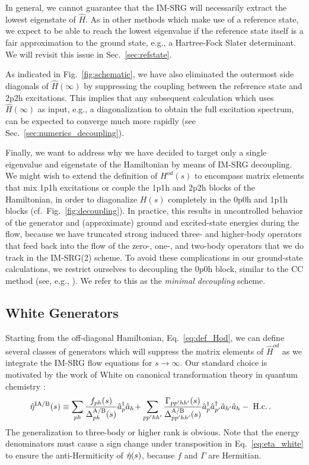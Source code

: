 In general, we cannot guarantee that the IM-SRG will necessarily extract the lowest eigenstate 
of $\hat{H}$. As in other methods which make use of a reference state, we expect to be able to reach 
the lowest eigenvalue if the reference state itself is a fair approximation to the ground state, e.g., 
a Hartree-Fock Slater determinant. We will revisit this issue in Sec.~\ref{sec:refstate}.

As indicated in Fig.~\ref{fig:schematic}, we have also eliminated the outermost side diagonals of 
$\hat{H}(\infty)$ by suppressing the coupling between the reference state and $2$p$2$h excitations. This 
implies that any subsequent calculation which uses $\hat{H}(\infty)$ as input, e.g., a diagonalization to 
obtain the full excitation spectrum, can be expected to converge much more rapidly (see 
Sec.~\ref{sec:numerics_decoupling}). 

Finally, we want to address why we have decided to target only a single eigenvalue and eigenstate
of the Hamiltonian by means of IM-SRG decoupling. We might wish to extend the definition 
of $H^{od}(s)$ to encompass matrix elements that mix 1p1h excitations or couple the 1p1h and 2p2h 
blocks of the Hamiltonian, in order to diagonalize $H(s)$ completely in the 0p0h and 1p1h blocks 
(cf.~Fig.~\ref{fig:decoupling}). In practice, this results in uncontrolled behavior of the generator 
and (approximate) ground and excited-state energies during the flow, because we have truncated strong induced 
three- and higher-body operators that feed back into the flow of the zero-, one-, and two-body operators that
we do track in the IM-SRG(2) scheme. To avoid these complications in our ground-state calculations, we 
restrict ourselves to decoupling the 0p0h block, similar to the CC method (see, e.g., 
\cite{shavittbartlett2009}). We refer to this as the \emph{minimal decoupling} scheme. 


\subsection{\label{sec:white}White Generators}
Starting from the off-diagonal Hamiltonian, Eq.~\eqref{eq:def_Hod}, we can define several classes of generators which will suppress the matrix elements of $\hat{H}^{od}$ as we integrate the IM-SRG flow equations for $s\to\infty$. Our standard choice is motivated by the work of White on canonical transformation theory in quantum chemistry \cite{white2002,tsukiyama2011}:
\begin{align}
  \etaO^\text{IA/B}(s)
  &\equiv\sum_{ph}\frac{f_{ph}(s)}{\Delta^\text{A/B}_{ph}(s)}{\aaO_{p}\aO_{h}\!}
  +\sum_{pp'hh'}\frac{\Gamma_{pp'hh'}(s)}{\Delta^\text{A/B}_{pp'hh'}(s)}{\aaO_{p}\aaO_{p'}\aO_{h'}\aO_{h}}-\;\text{H.c.}\,.\label{eq:eta_white}
\end{align}
The generalization to three-body or higher rank is obvious. Note that the energy denominators must cause a sign change under transposition in Eq.~\eqref{eq:eta_white} to ensure the anti-Hermiticity of $\hat{\eta}(s)$, because $f$ and $\Gamma$ are Hermitian.

